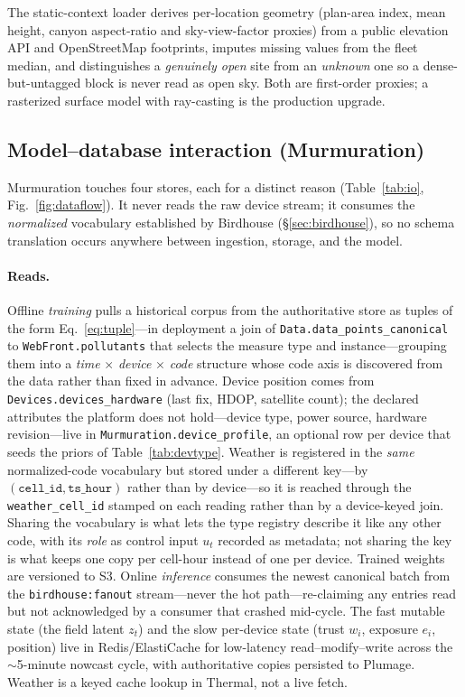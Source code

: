 \documentclass[10pt]{article}
\begin{document}
The static-context loader derives per-location
geometry (plan-area index, mean height, canyon aspect-ratio and sky-view-factor
proxies) from a public elevation API and OpenStreetMap footprints, imputes missing
values from the fleet median, and distinguishes a \emph{genuinely open} site from
an \emph{unknown} one so a dense-but-untagged block is never read as open sky.
Both are first-order proxies; a rasterized surface model with ray-casting is the
production upgrade.

\subsection{Model--database interaction (Murmuration)}
\label{sec:modeldb}
Murmuration touches four stores, each for a distinct reason
(Table~\ref{tab:io}, Fig.~\ref{fig:dataflow}). It never reads the raw device
stream; it consumes the \emph{normalized} vocabulary established by Birdhouse
(\S\ref{sec:birdhouse}), so no schema translation occurs anywhere between
ingestion, storage, and the model.

\paragraph{Reads.}
Offline \emph{training} pulls a historical corpus from the authoritative store
as tuples of the form Eq.~\eqref{eq:tuple}---in deployment a join of
\texttt{Data.data\_points\_canonical} to \texttt{WebFront.pollutants} that
selects the measure type and instance---grouping them into a \emph{time}
$\times$ \emph{device} $\times$ \emph{code} structure whose code axis is
discovered from the data rather than fixed in advance. Device position comes from
\texttt{Devices.devices\_hardware} (last fix, HDOP, satellite count); the
declared attributes the platform does not hold---device type, power source,
hardware revision---live in \texttt{Murmuration.device\_profile}, an optional
row per device that seeds the priors of Table~\ref{tab:devtype}. Weather is registered in the \emph{same}
normalized-code vocabulary but stored under a different key---by
$(\texttt{cell\_id},\texttt{ts\_hour})$ rather than by device---so it is reached
through the \texttt{weather\_cell\_id} stamped on each reading rather than by a
device-keyed join. Sharing the vocabulary is what lets the type registry describe
it like any other code, with its \emph{role} as control input $u_t$ recorded as
metadata; not sharing the key is what keeps one copy per cell-hour instead of one
per device. Trained weights are versioned to S3. Online \emph{inference} consumes the
newest canonical batch from the \texttt{birdhouse:fanout} stream---never the hot
path---re-claiming any entries read but not acknowledged by a consumer that
crashed mid-cycle. The fast
mutable state (the field latent $z_t$) and the slow per-device state (trust
$w_i$, exposure $e_i$, position) live in Redis/ElastiCache for low-latency
read--modify--write across the $\sim$5-minute nowcast cycle, with authoritative
copies persisted to Plumage. Weather is a keyed cache lookup in Thermal, not a
live fetch.
\end{document}
